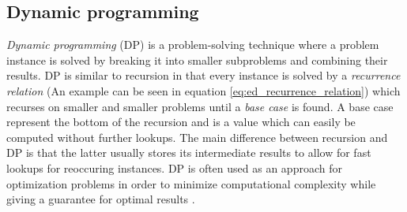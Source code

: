 \documentclass[thesis.tex]{subfiles}
\begin{document}
\subsection{Dynamic programming}
\label{sec:dynamic_programming}
\textit{Dynamic programming} (DP) is a problem-solving technique where a problem instance is solved by breaking it into smaller subproblems and combining their results. DP is similar to recursion in that every instance is solved by a \textit{recurrence relation} (An example can be seen in equation \ref{eq:ed_recurrence_relation}) which recurses on smaller and smaller problems until a \textit{base case} is found. A base case represent the bottom of the recursion and is a value which can easily be computed without further lookups. The main difference between recursion and DP is that the latter usually stores its intermediate results to allow for fast lookups for reoccuring instances. DP is often used as an approach for optimization problems in order to minimize computational complexity while giving a guarantee for optimal results \cite[Chapter 9]{algorithms_sequential_parallell_and_distributed}.\\
\par\noindent
\end{document}
